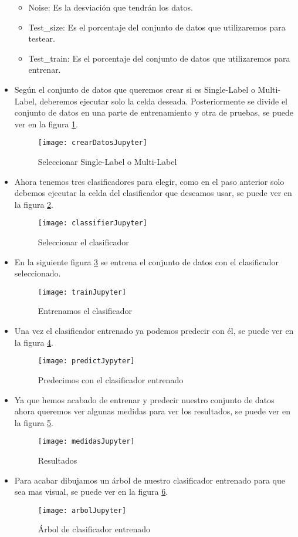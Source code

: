 \begin{itemize}
\begin{itemize}
		\item Noise: Es la desviación que tendrán los datos.
		\item Test\_size: Es el porcentaje del conjunto de datos que utilizaremos para testear.
		\item Test\_train: Es el porcentaje del conjunto de datos que utilizaremos para entrenar.
	\end{itemize}
	\item Según el conjunto de datos que queremos crear si es Single-Label o Multi-Label, deberemos ejecutar solo la celda deseada. Posteriormente se divide el conjunto de datos en una parte de entrenamiento y otra de pruebas, se puede ver en la figura \ref{fig:crearDatosJupyter}.
	\begin{figure}
	\centering
	\texttt{[image: crearDatosJupyter]}
	\caption{Seleccionar Single-Label o Multi-Label}
	\label{fig:crearDatosJupyter}
	\end{figure}
  	\item Ahora tenemos tres clasificadores para elegir, como en el paso anterior solo debemos ejecutar la celda del clasificador que deseamos usar, se puede ver en la figura \ref{fig:classifierJupyter}.
  	\begin{figure}
	\centering
	\texttt{[image: classifierJupyter]}
	\caption{Seleccionar el clasificador}
	\label{fig:classifierJupyter}
	\end{figure}
	\item En la siguiente figura \ref{fig:trainJupyter} se entrena el conjunto de datos con el clasificador seleccionado.
  	\begin{figure}
	\centering
	\texttt{[image: trainJupyter]}
	\caption{Entrenamos el clasificador}
	\label{fig:trainJupyter}
	\end{figure}
	\item Una vez el clasificador entrenado ya podemos predecir con él, se puede ver en la figura \ref{fig:predictJypyter}.
  	\begin{figure}
	\centering
	\texttt{[image: predictJypyter]}
	\caption{Predecimos con el clasificador entrenado}
	\label{fig:predictJypyter}
	\end{figure}
	\item Ya que hemos acabado de entrenar y predecir nuestro conjunto de datos ahora queremos ver algunas medidas para ver los resultados, se puede ver en la figura \ref{fig:medidasJupyter}.
  	\begin{figure}
	\centering
	\texttt{[image: medidasJupyter]}
	\caption{Resultados}
	\label{fig:medidasJupyter}
	\end{figure}
	\item Para acabar dibujamos un árbol de nuestro clasificador entrenado para que sea mas visual, se puede ver en la figura \ref{fig:arbolJupyter}.
  	\begin{figure}
	\centering
	\texttt{[image: arbolJupyter]}
	\caption{Árbol de clasificador entrenado}
	\label{fig:arbolJupyter}
	\end{figure}
\end{itemize}

